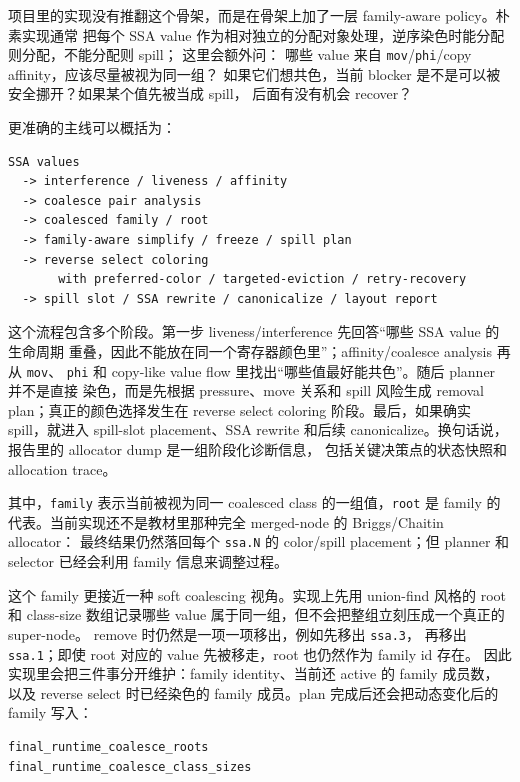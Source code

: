 \documentclass[UTF8,a4paper,11pt]{ctexart}
\begin{document}
项目里的实现没有推翻这个骨架，而是在骨架上加了一层 family-aware policy。朴素实现通常
把每个 SSA value 作为相对独立的分配对象处理，逆序染色时能分配则分配，不能分配则 spill；
这里会额外问：
哪些 value 来自 \texttt{mov}/\texttt{phi}/copy affinity，应该尽量被视为同一组？
如果它们想共色，当前 blocker 是不是可以被安全挪开？如果某个值先被当成 spill，
后面有没有机会 recover？

更准确的主线可以概括为：

\begin{lstlisting}[language={}]
SSA values
  -> interference / liveness / affinity
  -> coalesce pair analysis
  -> coalesced family / root
  -> family-aware simplify / freeze / spill plan
  -> reverse select coloring
       with preferred-color / targeted-eviction / retry-recovery
  -> spill slot / SSA rewrite / canonicalize / layout report
\end{lstlisting}

这个流程包含多个阶段。第一步 liveness/interference 先回答“哪些 SSA value 的生命周期
重叠，因此不能放在同一个寄存器颜色里”；affinity/coalesce analysis 再从 \texttt{mov}、
\texttt{phi} 和 copy-like value flow 里找出“哪些值最好能共色”。随后 planner 并不是直接
染色，而是先根据 pressure、move 关系和 spill 风险生成 removal plan；真正的颜色选择发生在
reverse select coloring 阶段。最后，如果确实 spill，就进入 spill-slot placement、SSA
rewrite 和后续 canonicalize。换句话说，报告里的 allocator dump 是一组阶段化诊断信息，
包括关键决策点的状态快照和 allocation trace。

其中，\texttt{family} 表示当前被视为同一 coalesced class 的一组值，\texttt{root} 是
family 的代表。当前实现还不是教材里那种完全 merged-node 的 Briggs/Chaitin allocator：
最终结果仍然落回每个 \texttt{ssa.N} 的 color/spill placement；但 planner 和 selector
已经会利用 family 信息来调整过程。

这个 family 更接近一种 soft coalescing 视角。实现上先用 union-find 风格的 root 和
class-size 数组记录哪些 value 属于同一组，但不会把整组立刻压成一个真正的 super-node。
remove 时仍然是一项一项移出，例如先移出 \texttt{ssa.3}，
再移出 \texttt{ssa.1}；即使 root 对应的 value 先被移走，root 也仍然作为 family id 存在。
因此实现里会把三件事分开维护：family identity、当前还 active 的 family 成员数，以及
reverse select 时已经染色的 family 成员。plan 完成后还会把动态变化后的 family 写入：

\begin{lstlisting}[language={}]
final_runtime_coalesce_roots
final_runtime_coalesce_class_sizes
\end{lstlisting}
\end{document}
